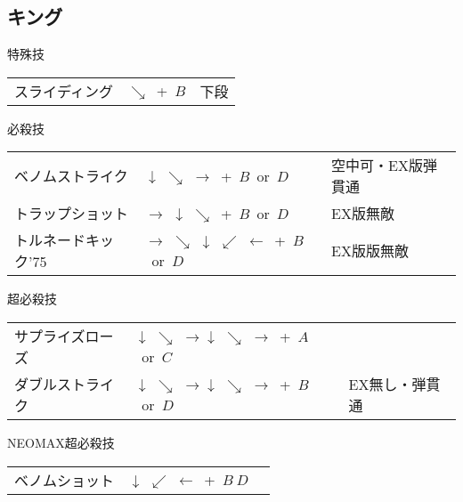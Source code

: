 \documentclass[a4j,11pt]{jarticle}
\def\hado{$\downarrow$ $\searrow$ $\rightarrow$}%
\def\tatsu{$\downarrow$ $\swarrow$ $\leftarrow$}%
\def\syoryu{$\rightarrow$ $\downarrow$ $\searrow$}%
\def\gyakuyoga{$\rightarrow$ $\searrow$ $\downarrow$ $\swarrow$ $\leftarrow$}%
\begin{document}
\subsection{キング}
\begin{itembox}[l]{特殊技}
\begin{tabular}{lll}
スライディング&$\searrow$\ +\ $B$&下段%
\end{tabular}
\end{itembox}
\begin{itembox}[l]{必殺技}
\begin{tabular}{lll}
ベノムストライク&\hado\ +\ $B$\ or\ $D$&空中可・EX版弾貫通\\%
トラップショット&\syoryu\ +\ $B$\ or\ $D$&EX版無敵\\%
トルネードキック'75&\gyakuyoga\ +\ $B$\ or\ $D$&EX版版無敵%
\end{tabular}
\end{itembox}
\begin{itembox}[l]{超必殺技}
\begin{tabular}{lll}
サプライズローズ&\hado\hado\ +\ $A$\ or\ $C$&\\%
ダブルストライク&\hado\hado\ +\ $B$\ or\ $D$&EX無し・弾貫通%
\end{tabular}
\end{itembox}
\begin{itembox}[l]{NEOMAX超必殺技}
\begin{tabular}{lll}
ベノムショット&\tatsu\ +\ $B\ D$&%
\end{tabular}
\end{itembox}
\newpage
\end{document}
